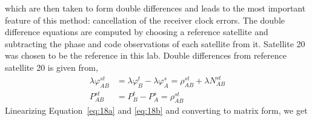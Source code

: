 which are then taken to form double differences and leads to the most important feature of this method: cancellation of the receiver clock errors. The double difference equations are computed by choosing a reference satellite and subtracting the phase and code observations of each satellite from it. Satellite 20 was chosen to be the reference in this lab. Double differences from reference satellite 20 is given from, 
\begin{align}
	\lambda \varphi_{AB}^{st} &= \lambda \varphi_{B}^{t} - \lambda \varphi_{A}^{s} = \rho_{AB}^{st} + \lambda N_{AB}^{st} \label{eq:18a} \\
	P_{AB}^{st} &= P_B^t - P_A^s = \rho_{AB}^{st} \label{eq:18b} 
\end{align}
Linearizing Equation~\eqref{eq:18a} and \eqref{eq:18b} and converting to matrix form, we get
